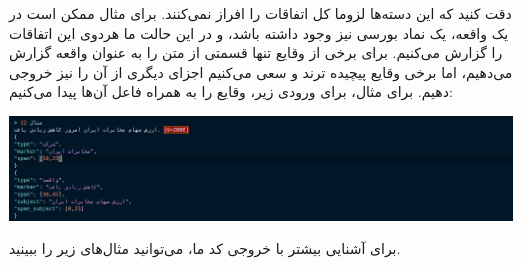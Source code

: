 \documentclass[a4paper,12pt]{article}
\begin{document}
دقت کنید که این دسته‌ها لزوما کل اتفاقات را افراز نمی‌کنند. برای مثال ممکن است در یک 
واقعه، یک نماد بورسی نیز وجود داشته باشد، و در این حالت ما هردوی این اتفاقات را گزارش می‌کنیم. برای برخی از وقایع 
تنها قسمتی از متن را به عنوان واقعه گزارش می‌دهیم، اما برخی وقایع پیچیده ترند و سعی می‌کنیم 
اجزای دیگری از آن را نیز خروجی دهیم. برای مثال، برای ورودی زیر، وقایع را به همراه 
فاعل آن‌ها پیدا می‌کنیم: 


\begin{center}
	\includegraphics[scale=0.5, trim ={0 0 17cm 0}, clip]{images/12.png}
\end{center}


برای آشنایی بیشتر با خروجی کد ما، می‌توانید مثال‌های زیر را ببینید. 
\end{document}
